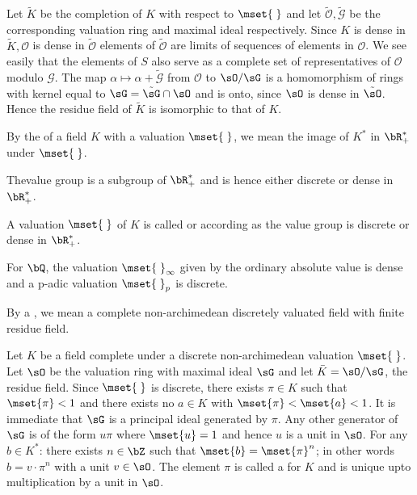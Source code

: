 Let $\tilde{K}$ be the completion of $K$ with respect to $\mset{\;}$ 
and let $\tilde{\mathscr{O}},\tilde{\mathscr{G}}$ be the corresponding 
valuation ring and maximal ideal respectively. Since $K$ is dense in 
$\tilde{K},\mathscr{O}$ is dense in $\tilde{\mathscr{O}}$ \ie elements
of $\tilde{\mathscr{O}}$ are limits of sequences of elements in 
$\mathscr{O}$. We see easily that the elements of $S$ also serve as a 
complete set of representatives of $\mathscr{O}$ modulo $\mathscr{G}$. 
The map $\alpha\mapsto\alpha +\tilde{\mathscr{G}}$ from $\mathscr{O}$ 
to $\sO/\sG$ is a homomorphism of rings with kernel equal to 
$\sG=\tilde{\sG}\cap\sO$ and is onto, since $\sO$ is dense in 
$\tilde{\sO}$. Hence the residue field of $\tilde{K}$ is isomorphic to 
that of $K$. 

\begin{defi*}
By the  of a field $K$ with a valuation $\mset{\;}$, 
we mean the image of $K^*$ in $\bR_+^*$ under $\mset{\;}$.
\end{defi*}

The\pageoriginale value group is a subgroup of $\bR_+^*$ and is hence 
either discrete or dense in $\bR_+^*$.

\begin{defi*}
A valuation $\mset{\;}$ of $K$ is called  or  
according as the value group is discrete or dense in $\bR_+^*$.
\end{defi*}

\begin{example*}
For $\bQ$, the valuation $\mset{\;}_\infty$ given by the ordinary 
absolute value is dense and a p-adic valuation $\mset{\;}_p$ is 
discrete.
\end{example*}

\begin{defi*}
By a , we mean a complete non-archimedean discretely 
valuated field with finite residue field.
\end{defi*}

Let $K$ be a field complete under a discrete non-archimedean valuation 
$\mset{\;}$. Let $\sO$ be the valuation ring with maximal ideal $\sG$ 
and let $\bar{K}=\sO/\sG$, the residue field. Since $\mset{\;}$ is 
discrete, there exists $\pi\in K$ such that $\mset{\pi}<1$ and there 
exists no $a\in K$ with $\mset{\pi}<\mset{a}<1$. It is immediate that 
$\sG$ is a principal ideal generated by $\pi$. Any other generator of 
$\sG$ is of the form $u\pi$ where $\mset{u}=1$ and hence $u$ is a unit 
in $\sO$. For any $b\in K^*$: there exists $n\in\bZ$ such that 
$\mset{b}=\mset{\pi}^n$; in other words $b=v\cdot\pi^n$ with a unit 
$v\in\sO$. The element $\pi$ is called a  
for $K$ and is unique upto multiplication by a unit in $\sO$.

